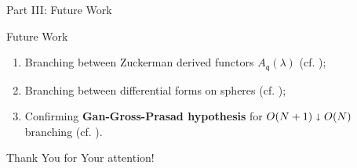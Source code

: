 \documentclass[pdf]{beamer}
\theoremstyle{mystyle}
\theoremstyle{remark}
\begin{document}
\begin{frame}{}
	\begin{center}
		\huge Part III: Future Work
	\end{center}
\end{frame}
\begin{frame}{Future Work}
	\begin{enumerate}
		\item Branching between Zuckerman derived functors $A_{\mathfrak{q}}(\lambda)$ (cf. \cite{KO1,kobayashi1998discrete3});
		\item Branching between differential forms on spheres (cf. \cite{kobayashi2016classification,kobayashi2017symmetry});
		\item Confirming {\bf Gan-Gross-Prasad hypothesis} for $O(N+1)\shortdownarrow O(N)$ branching (cf. \cite{kobayashi2017symmetry}).
	\end{enumerate}
\end{frame}
\begin{frame}{}
	\begin{center}
		\huge Thank You for Your attention!
	\end{center}
\end{frame}
\end{document}

